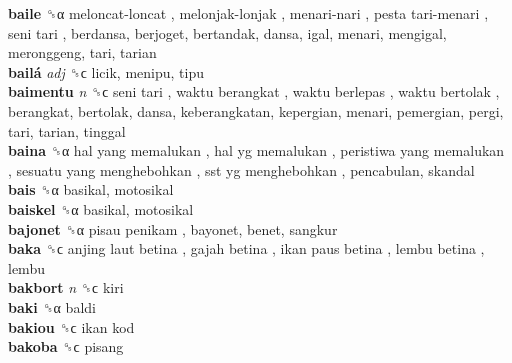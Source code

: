 \textbf{baile} ␝α   meloncat-loncat ,  melonjak-lonjak ,  menari-nari ,  pesta tari-menari ,  seni tari , berdansa, berjoget, bertandak, dansa, igal, menari, mengigal, meronggeng, tari, tarian  \\
\textbf{bailá} \emph{adj}  ␝ϲ  licik, menipu, tipu  \\
\textbf{baimentu} \emph{n}  ␝ϲ   seni tari ,  waktu berangkat ,  waktu berlepas ,  waktu bertolak , berangkat, bertolak, dansa, keberangkatan, kepergian, menari, pemergian, pergi, tari, tarian, tinggal  \\
\textbf{baina} ␝α   hal yang memalukan ,  hal yg memalukan ,  peristiwa yang memalukan ,  sesuatu yang menghebohkan ,  sst yg menghebohkan , pencabulan, skandal  \\
\textbf{bais} ␝α  basikal, motosikal  \\
\textbf{baiskel} ␝α  basikal, motosikal  \\
\textbf{bajonet} ␝α   pisau penikam , bayonet, benet, sangkur  \\
\textbf{baka} ␝ϲ   anjing laut betina ,  gajah betina ,  ikan paus betina ,  lembu betina , lembu  \\
\textbf{bakbort} \emph{n}  ␝ϲ  kiri  \\
\textbf{baki} ␝α  baldi  \\
\textbf{bakiou} ␝ϲ   ikan kod   \\
\textbf{bakoba} ␝ϲ  pisang  \\
